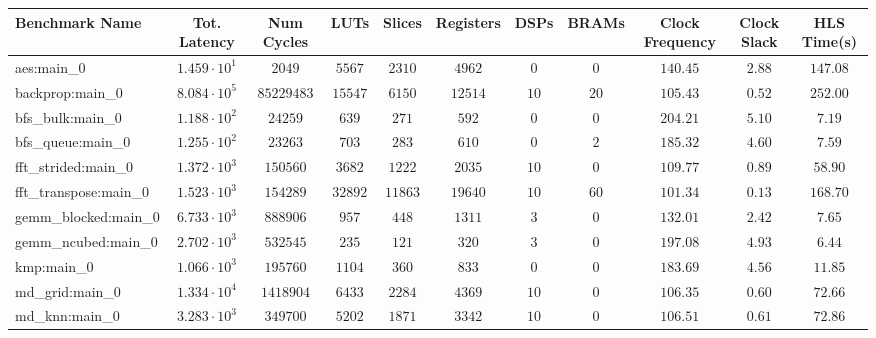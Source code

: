 \begin{tabular}{|l|c|c|c|c|c|c|c|c|c|c|}
\hline
Benchmark Name         & Tot. Latency           & Num Cycles   & LUTs      & Slices    & Registers & DSPs    & BRAMs  & Clock Frequency & Clock Slack & HLS Time(s) \\
\hline
aes:main\_0            & $ 1.459 \cdot 10^{1} $ & $ 2049     $ & $ 5567  $ & $ 2310  $ & $ 4962  $ & $ 0   $ & $ 0  $ & $ 140.45      $ & $ 2.88    $ & $ 147.08  $ \\
backprop:main\_0       & $ 8.084 \cdot 10^{5} $ & $ 85229483 $ & $ 15547 $ & $ 6150  $ & $ 12514 $ & $ 10  $ & $ 20 $ & $ 105.43      $ & $ 0.52    $ & $ 252.00  $ \\
bfs\_bulk:main\_0      & $ 1.188 \cdot 10^{2} $ & $ 24259    $ & $ 639   $ & $ 271   $ & $ 592   $ & $ 0   $ & $ 0  $ & $ 204.21      $ & $ 5.10    $ & $ 7.19    $ \\
bfs\_queue:main\_0     & $ 1.255 \cdot 10^{2} $ & $ 23263    $ & $ 703   $ & $ 283   $ & $ 610   $ & $ 0   $ & $ 2  $ & $ 185.32      $ & $ 4.60    $ & $ 7.59    $ \\
fft\_strided:main\_0   & $ 1.372 \cdot 10^{3} $ & $ 150560   $ & $ 3682  $ & $ 1222  $ & $ 2035  $ & $ 10  $ & $ 0  $ & $ 109.77      $ & $ 0.89    $ & $ 58.90   $ \\
fft\_transpose:main\_0 & $ 1.523 \cdot 10^{3} $ & $ 154289   $ & $ 32892 $ & $ 11863 $ & $ 19640 $ & $ 10  $ & $ 60 $ & $ 101.34      $ & $ 0.13    $ & $ 168.70  $ \\
gemm\_blocked:main\_0  & $ 6.733 \cdot 10^{3} $ & $ 888906   $ & $ 957   $ & $ 448   $ & $ 1311  $ & $ 3   $ & $ 0  $ & $ 132.01      $ & $ 2.42    $ & $ 7.65    $ \\
gemm\_ncubed:main\_0   & $ 2.702 \cdot 10^{3} $ & $ 532545   $ & $ 235   $ & $ 121   $ & $ 320   $ & $ 3   $ & $ 0  $ & $ 197.08      $ & $ 4.93    $ & $ 6.44    $ \\
kmp:main\_0            & $ 1.066 \cdot 10^{3} $ & $ 195760   $ & $ 1104  $ & $ 360   $ & $ 833   $ & $ 0   $ & $ 0  $ & $ 183.69      $ & $ 4.56    $ & $ 11.85   $ \\
md\_grid:main\_0       & $ 1.334 \cdot 10^{4} $ & $ 1418904  $ & $ 6433  $ & $ 2284  $ & $ 4369  $ & $ 10  $ & $ 0  $ & $ 106.35      $ & $ 0.60    $ & $ 72.66   $ \\
md\_knn:main\_0        & $ 3.283 \cdot 10^{3} $ & $ 349700   $ & $ 5202  $ & $ 1871  $ & $ 3342  $ & $ 10  $ & $ 0  $ & $ 106.51      $ & $ 0.61    $ & $ 72.86   $ \\

\end{tabular}

